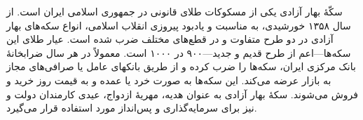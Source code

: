 سکّهٔ بهار آزادی یکی از مسکوکات طلای قانونی در جمهوری اسلامی ایران است. از سال ۱۳۵۸ خورشیدی، به مناسبت و یادبود پیروزی انقلاب اسلامی، انواع سکه‌های بهار آزادی در دو طرح متفاوت و در قطع‌های مختلف ضرب شده است. عیار طلای این سکه‌ها---اعم از طرح قدیم و جدید---۹۰۰ در ۱۰۰۰ است. معمولاً در هر سال ضرابخانهٔ بانک مرکزی ایران، سکه‌ها را ضرب کرده و از طریق بانکهای عامل یا صرافی‌های مجاز به بازار عرضه می‌کند. این سکه‌ها به صورت خرد یا عمده و به قیمت روز خرید و فروش می‌شوند. سکهٔ بهار آزادی به عنوان هدیه، مهریهٔ ازدواج، عیدی کارمندان دولت و نیز برای سرمایه‌گذاری و پس‌انداز مورد استفاده قرار می‌گیرد.

